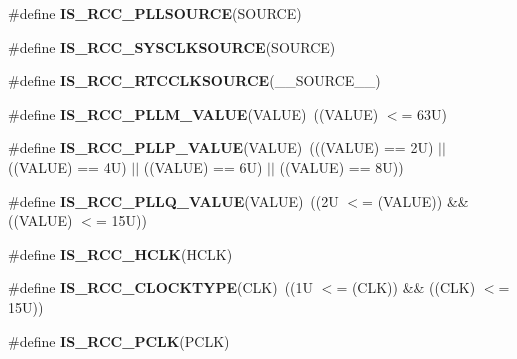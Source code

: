 \begin{DoxyCompactItemize}
\#define {\bfseries I\+S\+\_\+\+R\+C\+C\+\_\+\+P\+L\+L\+S\+O\+U\+R\+CE}(S\+O\+U\+R\+CE)
\item 
\#define {\bfseries I\+S\+\_\+\+R\+C\+C\+\_\+\+S\+Y\+S\+C\+L\+K\+S\+O\+U\+R\+CE}(S\+O\+U\+R\+CE)
\item 
\mbox{\label{group___r_c_c___i_s___r_c_c___definitions_gacd1d98013cd9a28e8b1544adf931e7b3}} 
\#define {\bfseries I\+S\+\_\+\+R\+C\+C\+\_\+\+R\+T\+C\+C\+L\+K\+S\+O\+U\+R\+CE}(\+\_\+\+\_\+\+S\+O\+U\+R\+C\+E\+\_\+\+\_\+)
\item 
\mbox{\label{group___r_c_c___i_s___r_c_c___definitions_ga8db327c085e20aeb673a9784f8508597}} 
\#define {\bfseries I\+S\+\_\+\+R\+C\+C\+\_\+\+P\+L\+L\+M\+\_\+\+V\+A\+L\+UE}(V\+A\+L\+UE)~((V\+A\+L\+UE) $<$= 63\+U)
\item 
\mbox{\label{group___r_c_c___i_s___r_c_c___definitions_gad808f83505f4e802e5bafab7831f0235}} 
\#define {\bfseries I\+S\+\_\+\+R\+C\+C\+\_\+\+P\+L\+L\+P\+\_\+\+V\+A\+L\+UE}(V\+A\+L\+UE)~(((V\+A\+L\+UE) == 2\+U) $\vert$$\vert$ ((\+V\+A\+L\+U\+E) == 4\+U) $\vert$$\vert$ ((\+V\+A\+L\+U\+E) == 6\+U) $\vert$$\vert$ ((\+V\+A\+L\+U\+E) == 8\+U))
\item 
\mbox{\label{group___r_c_c___i_s___r_c_c___definitions_gad66dbe75bf8ab2b64b200e796281a851}} 
\#define {\bfseries I\+S\+\_\+\+R\+C\+C\+\_\+\+P\+L\+L\+Q\+\_\+\+V\+A\+L\+UE}(V\+A\+L\+UE)~((2\+U $<$= (\+V\+A\+L\+U\+E)) \&\& ((\+V\+A\+L\+U\+E) $<$= 15\+U))
\item 
\#define {\bfseries I\+S\+\_\+\+R\+C\+C\+\_\+\+H\+C\+LK}(H\+C\+LK)
\item 
\mbox{\label{group___r_c_c___i_s___r_c_c___definitions_gaedf7abbab300ed340b88d5f665910707}} 
\#define {\bfseries I\+S\+\_\+\+R\+C\+C\+\_\+\+C\+L\+O\+C\+K\+T\+Y\+PE}(C\+LK)~((1\+U $<$= (\+C\+L\+K)) \&\& ((\+C\+L\+K) $<$= 15\+U))
\item 
\#define {\bfseries I\+S\+\_\+\+R\+C\+C\+\_\+\+P\+C\+LK}(P\+C\+LK)
\item 
\mbox{\label{group___r_c_c___i_s___r_c_c___definitions_gaac2d2f9b0c3e2f4fbe2131d779080964}} 
$$
\end{DoxyCompactItemize}
